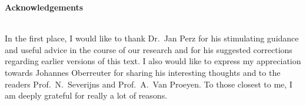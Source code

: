 \documentclass[12pt,twoside]{book}
\begin{document}
\renewcommand{\sectionmark}[1]{%
\markright{
\thesection%
\ #1}{}}

\fancyhead{} %
\fancyhead[RO,LE]{\thepage}
\fancyhead[RE]{\nouppercase{\leftmark}}
\fancyhead[LO]{\nouppercase{\rightmark}}
\fancyfoot{} %
\renewcommand{\headrulewidth}{0.4pt}


\tableofcontents


\newpage
\thispagestyle{empty}
\mbox{}
\vfill
\noindent
\begin{LARGE}\textbf{Acknowledgements}\end{LARGE}\\

\noindent
In the first place, I would like to thank Dr.\ Jan Perz for his stimulating guidance and useful advice in the course of our research and for his suggested corrections regarding earlier versions of this text. I also would like to express my appreciation towards Johannes Oberreuter for sharing his interesting thoughts and to the readers Prof.\ N.\ Severijns and Prof.\ A.\ Van Proeyen. To those closest to me, I am deeply grateful for really a lot of reasons.

\newpage
\thispagestyle{empty}
\mainmatter


\renewcommand{\chaptermark}[1]{%
\markboth{\chaptername%
\ \thechapter.%
\ #1}{}}

\renewcommand{\sectionmark}[1]{%
\markright{
\thesection%
\ #1}{}}

\fancyhead{} %
\fancyhead[RO,LE]{\thepage}
\fancyhead[RE]{\leftmark}
\fancyhead[LO]{\rightmark}
\fancyfoot{} %
\renewcommand{\headrulewidth}{0.4pt}

\end{document}
